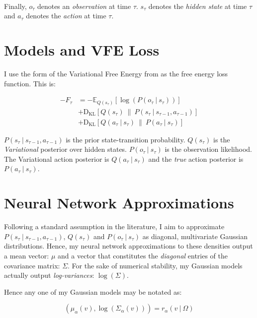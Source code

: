 \documentclass{article}
\begin{document}
\

Finally, $o_{\tau}$ denotes an \textit{observation} at time $\tau$. $s_{\tau}$ denotes the \textit{hidden state} at time $\tau$ and $a_{\tau}$ denotes the \textit{action} at time $\tau$.

\section{Models and VFE Loss}
I use the form of the Variational Free Energy from \cite{DEEP-AIF-For-POMDPs} as the free energy loss function. This is:

\begin{equation}
    \begin{aligned}
        \label{eq:true_VFE}
        -F_{\tau} &= -\mathbb{E}_{Q(s_{\tau})}[\log{(P(o_{\tau} \ | \ s_{\tau}))}] \\
        &+ \text{D}_{\text{KL}}[Q(s_{\tau}) \ \| \ P(s_{\tau} \ | \ s_{\tau - 1}, a_{\tau - 1})] \\
        &+ \text{D}_{\text{KL}}[Q(a_{\tau} \ | \ s_{\tau}) \ \| \ P(a_{\tau} \ | \ s_{\tau})]
    \end{aligned}
\end{equation}

$P(s_{\tau} \ | \ s_{\tau - 1}, a_{\tau - 1})$ is the prior state-transition probability. $Q(s_{\tau})$ is the \textit{Variational} posterior over hidden states. $P(o_{\tau} \ | \ s_{\tau})$ is the observation likelihood. The Variational action posterior is $Q(a_{\tau} \ | \ s_{\tau})$ and the \textit{true} action posterior is $P(a_{\tau} \ | \ s_{\tau})$.

\section{Neural Network Approximations}
Following a standard assumption in the literature, I aim to approximate $P(s_{\tau} \ | \ s_{\tau - 1}, a_{\tau - 1})$, $Q(s_{\tau})$ and $P(o_{\tau} \ | \ s_{\tau})$ as diagonal, multivariate Gaussian distributions. Hence, my neural network approximations to these densities output a mean vector: $\mu$ and a vector that constitutes the \textit{diagonal} entries of the covariance matrix: $\Sigma$. For the sake of numerical stability, my Gaussian models actually output \textit{log-variances}: $\log{(\Sigma)}$.

Hence any one of my Gaussian models may be notated as:

\begin{equation}
    \label{eq:Gauss_model_form}
    (\mu_{\alpha}(v), \log{(\Sigma_{\alpha}(v))}) = r_{\alpha}(v \ | \ \Omega)
\end{equation}
\end{document}
